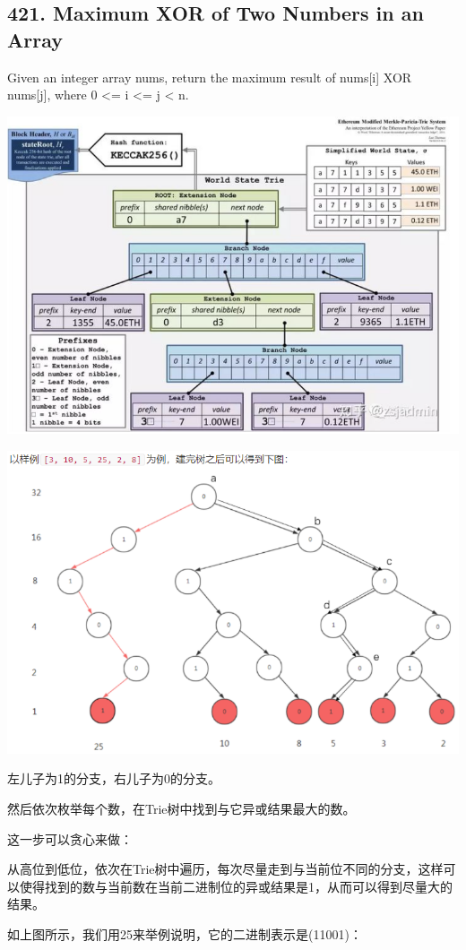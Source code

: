 \documentclass[9pt, b5paaper]{book}
\begin{document}
\subsection{421. Maximum XOR of Two Numbers in an Array}
\label{sec-2-1-5}
Given an integer array nums, return the maximum result of nums[i] XOR nums[j], where 0 <= i <= j < n.

\includegraphics[width=.9\linewidth]{./pic/numTrie.png}

\includegraphics[width=.9\linewidth]{./pic/numTrie2.png}

左儿子为1的分支，右儿子为0的分支。

然后依次枚举每个数，在Trie树中找到与它异或结果最大的数。

这一步可以贪心来做：

从高位到低位，依次在Trie树中遍历，每次尽量走到与当前位不同的分支，这样可以使得找到的数与当前数在当前二进制位的异或结果是1，从而可以得到尽量大的结果。

如上图所示，我们用25来举例说明，它的二进制表示是(11001)：
\end{document}
